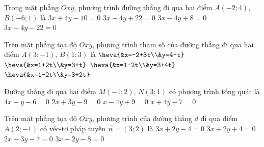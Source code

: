 \begin{ex}%
	Trong mặt phẳng $Oxy$, phương trình đường thẳng đi qua  hai điểm $A(-2;4)$, $B(-6;1)$ là
	 \choice
		 {$3x+4y-10=0$}
		 {\True $3x-4y+22=0$}
		 {$3x-4y+8=0$}
		 {$3x-4y-22=0$}
\end{ex}

\begin{ex}%
	Trên mặt phẳng tọa độ $Oxy$, phương trình tham số của đường thẳng đi  qua hai điểm $A(3;-1)$, $B(1;3)$ là
	\choice 
		 {$\heva{&x=-2+3t\\&y=4-t}$}
		 {$\heva{&x=1+2t\\&y=3+t}$}
		 {\True $\heva{&x=1-2t\\&y=3+4t}$}
		 {$\heva{&x=1-2t\\&y=3+2t}$}
\end{ex}

\begin{ex}%
	Đường thẳng  đi qua hai điểm $M(-1; 2)$, $N(3; 1)$ có phương trình tổng quát là
	 \choice
		 {$4x-y-6=0$}
		{$2x+3y-9=0$} 
		{$x-4y+9=0$} 
		{\True  $x+4y-7=0$}
\end{ex}

\begin{ex}%
	Trên mặt phẳng tọa độ $Oxy$, phương trình của  đường thẳng $d$ đi qua điểm $A(2;-1)$ có véc-tơ pháp tuyến $\overrightarrow{n}=(3;2)$ là
	\choice 
		{\True $3x+2y-4=0$} 
		{$3x+2y+4=0$} 
		 {$2x-3y-7=0$}
		{$3x-2y-8=0$} 
\end{ex}

